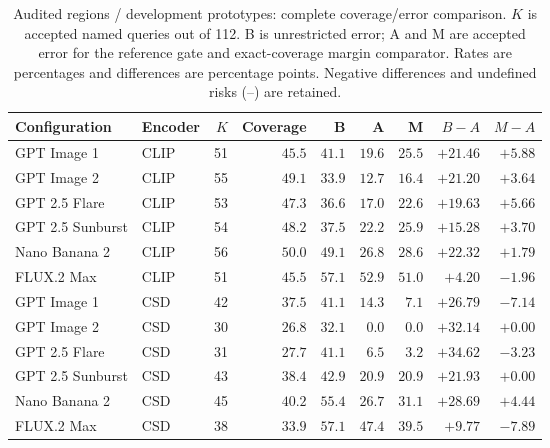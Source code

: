 \begin{table}[!htbp]
\caption{Audited regions / development prototypes: complete coverage/error comparison. $K$ is accepted named queries out of 112. B is unrestricted error; A and M are accepted error for the reference gate and exact-coverage margin comparator. Rates are percentages and differences are percentage points. Negative differences and undefined risks (--) are retained.}
\label{tab:selective-risks-audited-region-development}
\centering\footnotesize\setlength{\tabcolsep}{3pt}
\begin{tabularx}{\linewidth}{@{}Xlrrrrrrr@{}}\toprule
Configuration & Encoder & $K$ & Coverage & B & A & M & $B-A$ & $M-A$\\\midrule
GPT Image 1 & CLIP & 51 & $45.5$ & $41.1$ & $19.6$ & $25.5$ & $+21.46$ & $+5.88$\\
GPT Image 2 & CLIP & 55 & $49.1$ & $33.9$ & $12.7$ & $16.4$ & $+21.20$ & $+3.64$\\
GPT 2.5 Flare & CLIP & 53 & $47.3$ & $36.6$ & $17.0$ & $22.6$ & $+19.63$ & $+5.66$\\
GPT 2.5 Sunburst & CLIP & 54 & $48.2$ & $37.5$ & $22.2$ & $25.9$ & $+15.28$ & $+3.70$\\
Nano Banana 2 & CLIP & 56 & $50.0$ & $49.1$ & $26.8$ & $28.6$ & $+22.32$ & $+1.79$\\
FLUX.2 Max & CLIP & 51 & $45.5$ & $57.1$ & $52.9$ & $51.0$ & $+4.20$ & $-1.96$\\
GPT Image 1 & CSD & 42 & $37.5$ & $41.1$ & $14.3$ & $7.1$ & $+26.79$ & $-7.14$\\
GPT Image 2 & CSD & 30 & $26.8$ & $32.1$ & $0.0$ & $0.0$ & $+32.14$ & $+0.00$\\
GPT 2.5 Flare & CSD & 31 & $27.7$ & $41.1$ & $6.5$ & $3.2$ & $+34.62$ & $-3.23$\\
GPT 2.5 Sunburst & CSD & 43 & $38.4$ & $42.9$ & $20.9$ & $20.9$ & $+21.93$ & $+0.00$\\
Nano Banana 2 & CSD & 45 & $40.2$ & $55.4$ & $26.7$ & $31.1$ & $+28.69$ & $+4.44$\\
FLUX.2 Max & CSD & 38 & $33.9$ & $57.1$ & $47.4$ & $39.5$ & $+9.77$ & $-7.89$\\
\bottomrule\end{tabularx}
\end{table}

